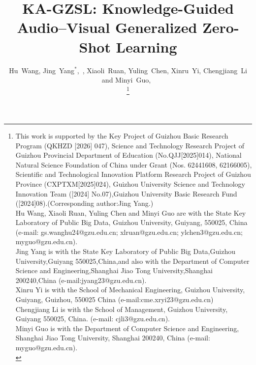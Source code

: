 \documentclass[10pt,journal,twoside]{IEEEtran}
\begin{document}
\title{KA-GZSL: Knowledge-Guided Audio–Visual Generalized Zero-Shot Learning}

\author{
Hu~Wang,  %
Jing~Yang$^{*}$,~,
Xiaoli~Ruan,
Yuling~Chen,
Xinru~Yi,
Chengjiang~Li
and
Minyi~Guo,~




\thanks{This work is supported by the Key Project of Guizhou Basic Research Program (QKHZD [2026] 047), Science and Technology Research Project of Guizhou Provincial Department of Education (No.QJJ[2025]014), National Natural Science Foundation of China under Grant (Nos. 62441608, 62166005), Scientific and Technological Innovation Platform Research Project of Guizhou Province (CXPTXM[2025]024),
Guizhou University Science and Technology Innovation Team ([2024] No.07),Guizhou University Basic Research Fund ([2024]08).(Corresponding author:Jing Yang.)\\
  \indent Hu Wang, Xiaoli Ruan, Yuling Chen and Minyi Guo are with the State Key Laboratory
 of Public Big Data, Guizhou University, Guiyang, 550025, China (e-mail: gs.wanghu24@gzu.edu.cn; xlruan@gzu.edu.cn; ylchen3@gzu.edu.cn; myguo@gzu.edu.cn).\\
 \indent Jing Yang is with the State Key Laboratory of Public Big Data,Guizhou University,Guiyang 550025,China,and also with the Department of Computer Science and Engineering,Shanghai Jiao Tong University,Shanghai 200240,China (e-mail:jyang23@gzu.edu.cn).\\
 \indent Xinru Yi is with the School of Mechanical Engineering, Guizhou University, Guiyang, Guizhou, 550025 China (e-mail:cme.xryi23@gzu.edu.cn)\\
  \indent Chengjiang Li is with the School of Management, Guizhou University, Guiyang 550025, China. (e-mail: cjli3@gzu.edu.cn).\\
  \indent  Minyi Guo is with the Department of Computer Science and Engineering, Shanghai Jiao Tong University, Shanghai 200240, China (e-mail: myguo@gzu.edu.cn).\\
  }
}
\end{document}
